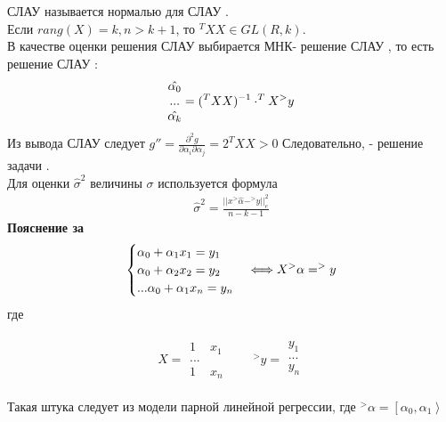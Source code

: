 \documentclass[__main__.tex]{subfiles}
\begin{document}
СЛАУ  называется нормалью для СЛАУ .\\
Если $rang(X) = k , n>k+1$, то $^TX X \in GL(R,k)$.\\
В качестве оценки решения СЛАУ  выбирается МНК- решение СЛАУ , то есть решение СЛАУ :\\
\begin{gather}
    \llabel{9:7}
    \begin{matrix}
        \hat{\alpha_0} \\
        ...            \\
        \hat{\alpha_k}
    \end{matrix}
    = (^TXX)^{-1}\cdot ^TX^>y
\end{gather}
Из вывода СЛАУ  следует $g'' = \frac{\partial^2g}{\partial \alpha_i \partial \alpha_j} = 2 ^TXX>0$
Следовательно,  - решение задачи .\\
Для оценки $\hat{\sigma}^2$ величины $\sigma$ используется формула
\begin{gather}
    \hat{\sigma}^2 = \frac{||x ^>\hat{\alpha} - ^>y||^2_e}{n-k-1}
\end{gather}
\textbf{Пояснение за }
\begin{gather}
    \llabel{9:10}
    \begin{cases}
        \alpha_0 + \alpha_1x_1 = y_1 \\
        \alpha_0 + \alpha_2x_2 = y_2 \\
        ...
        \alpha_0 + \alpha_1x_n = y_n
    \end{cases}
    \Longleftrightarrow X ^>\alpha = ^>y
\end{gather}
где

\begin{gather}
    X = \begin{matrix}
        1 & x_1 \\
        ...     \\
        1 & x_n
    \end{matrix}
    \qquad ^>y =
    \begin{matrix}
        y_1 \\
        ... \\
        y_n \\
    \end{matrix}
\end{gather}

Такая штука следует из модели парной линейной регрессии, где $^>\alpha = \left[\alpha_0,\alpha_1\right>$
\end{document}
